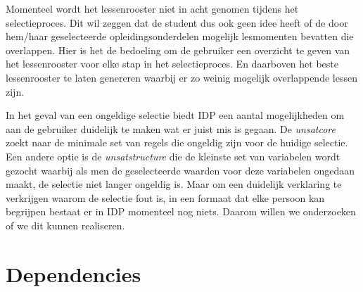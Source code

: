 Momenteel wordt het lessenrooster niet in acht genomen tijdens het selectieproces. Dit wil zeggen dat de student dus ook geen idee heeft of de door hem/haar geselecteerde opleidingsonderdelen mogelijk lesmomenten bevatten die overlappen. Hier is het de bedoeling om de gebruiker een overzicht te geven van het lessenrooster voor elke stap in het selectieproces. En daarboven het beste lessenrooster te laten genereren waarbij er zo weinig mogelijk overlappende lessen zijn.

In het geval van een ongeldige selectie biedt IDP een aantal mogelijkheden om aan de gebruiker duidelijk te maken wat er juist mis is gegaan. De \emph{unsatcore} zoekt naar de minimale set van regels die ongeldig zijn voor de huidige selectie. Een andere optie is de \emph{unsatstructure} die de kleinste set van variabelen wordt gezocht waarbij als men de geselecteerde waarden voor deze variabelen ongedaan maakt, de selectie niet langer ongeldig is. Maar om een duidelijk verklaring te verkrijgen waarom de selectie fout is, in een formaat dat elke persoon kan begrijpen bestaat er in IDP momenteel nog niets. Daarom willen we onderzoeken of we dit kunnen realiseren.

\section{Dependencies}
